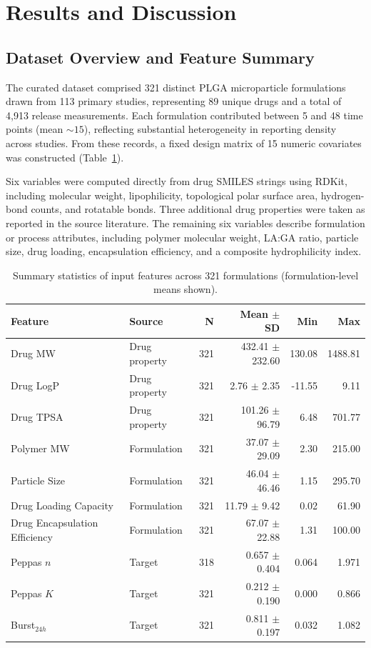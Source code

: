 \section{Results and Discussion}

\subsection{Dataset Overview and Feature Summary}

The curated dataset comprised 321 distinct PLGA microparticle formulations drawn from 113 primary studies, representing 89 unique drugs and a total of 4{,}913 release measurements. Each formulation contributed between 5 and 48 time points (mean $\sim 15$), reflecting substantial heterogeneity in reporting density across studies. From these records, a fixed design matrix of 15 numeric covariates was constructed (Table~\ref{tab:summary_stats}).

Six variables were computed directly from drug SMILES strings using RDKit, including molecular weight, lipophilicity, topological polar surface area, hydrogen-bond counts, and rotatable bonds. Three additional drug properties were taken as reported in the source literature. The remaining six variables describe formulation or process attributes, including polymer molecular weight, LA:GA ratio, particle size, drug loading, encapsulation efficiency, and a composite hydrophilicity index.


\begin{table}[H]
\centering
\caption{Summary statistics of input features across 321 formulations (formulation-level means shown).}
\label{tab:summary_stats}
\small
\begin{tabular}{llrrrr}
\toprule
Feature & Source & N & Mean $\pm$ SD & Min & Max \\
\midrule
Drug MW & Drug property & 321 & 432.41 $\pm$ 232.60 & 130.08 & 1488.81 \\
Drug LogP & Drug property & 321 & 2.76 $\pm$ 2.35 & -11.55 & 9.11 \\
Drug TPSA & Drug property & 321 & 101.26 $\pm$ 96.79 & 6.48 & 701.77 \\
Polymer MW & Formulation & 321 & 37.07 $\pm$ 29.09 & 2.30 & 215.00 \\
Particle Size & Formulation & 321 & 46.04 $\pm$ 46.46 & 1.15 & 295.70 \\
Drug Loading Capacity & Formulation & 321 & 11.79 $\pm$ 9.42 & 0.02 & 61.90 \\
Drug Encapsulation Efficiency & Formulation & 321 & 67.07 $\pm$ 22.88 & 1.31 & 100.00 \\
\midrule
Peppas $n$ & Target & 318 & 0.657 $\pm$ 0.404 & 0.064 & 1.971 \\
Peppas $K$ & Target & 321 & 0.212 $\pm$ 0.190 & 0.000 & 0.866 \\
Burst$_{24h}$ & Target & 321 & 0.811 $\pm$ 0.197 & 0.032 & 1.082 \\
\bottomrule
\end{tabular}
\end{table}

